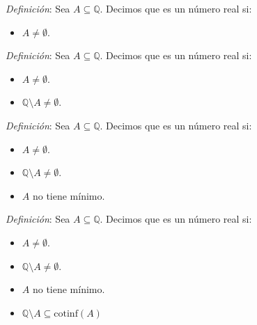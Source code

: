 \documentclass{beamer}
\newcommand{\cinf}[1]{\text{cotinf}(#1)}
\begin{document}
  \begin{frame}
    \textit{Definición}: Sea $A \subseteq \mathbb{Q}$. Decimos que es un número real si:

    \begin{itemize}
      \item $A \neq \emptyset$.
    \end{itemize}

  \end{frame}

  \begin{frame}
    \textit{Definición}: Sea $A \subseteq \mathbb{Q}$. Decimos que es un número real si:

    \begin{itemize}
      \item $A \neq \emptyset$.
      \item $\mathbb{Q}\setminus A \neq \emptyset$.
    \end{itemize}

  \end{frame}

  \begin{frame}
    \textit{Definición}: Sea $A \subseteq \mathbb{Q}$. Decimos que es un número real si:

    \begin{itemize}
      \item $A \neq \emptyset$.
      \item $\mathbb{Q}\setminus A \neq \emptyset$.
      \item $A$ no tiene mínimo.
    \end{itemize}

  \end{frame}

  \begin{frame}
    \textit{Definición}: Sea $A \subseteq \mathbb{Q}$. Decimos que es un número real si:

    \begin{itemize}
      \item $A \neq \emptyset$.
      \item $\mathbb{Q}\setminus A \neq \emptyset$.
      \item $A$ no tiene mínimo.
      \item $\mathbb{Q}\setminus A \subseteq \cinf{A}$
    \end{itemize}

  \end{frame}
\end{document}
